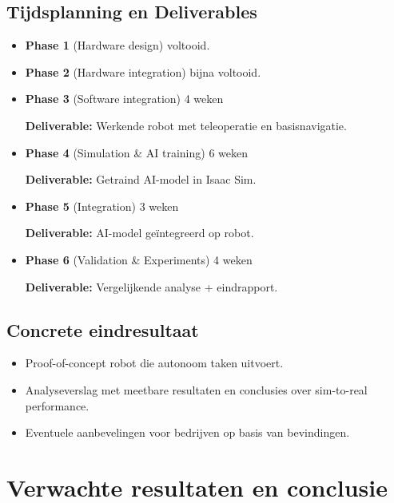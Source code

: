 \subsection{Tijdsplanning en Deliverables}
\begin{itemize}
    \item \textbf{Phase 1} (Hardware design) voltooid.
    \item \textbf{Phase 2} (Hardware integration) bijna voltooid.
    \item \textbf{Phase 3} (Software integration) 4 weken
    
    \textbf{Deliverable:} Werkende robot met teleoperatie en basisnavigatie.
    \item \textbf{Phase 4} (Simulation \& AI training) 6 weken
    
    \textbf{Deliverable:} Getraind AI-model in Isaac Sim.
    \item \textbf{Phase 5} (Integration) 3 weken
    
    \textbf{Deliverable:} AI-model geïntegreerd op robot.
    \item \textbf{Phase 6} (Validation \& Experiments) 4 weken
    
    \textbf{Deliverable:} Vergelijkende analyse + eindrapport.
\end{itemize}

\subsection{Concrete eindresultaat}
\begin{itemize}
    \item Proof-of-concept robot die autonoom taken uitvoert.
    \item Analyseverslag met meetbare resultaten en conclusies over sim-to-real performance.
    \item Eventuele aanbevelingen voor bedrijven op basis van bevindingen.
\end{itemize}

\section{Verwachte resultaten en conclusie}%
\label{sec:Verwachte_resultaten_en_conclusie}

